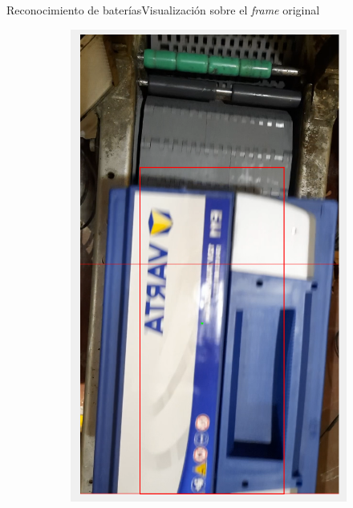 \documentclass{beamer}
\begin{document}
\begin{frame}{Reconocimiento de baterías}{Visualización sobre el \textit{frame} original}
\begin{figure}
    \begin{subfigure}[b]{0.4\textwidth}
        \includegraphics[width=\textwidth]{img/P2.png}
    \end{subfigure}
\end{figure}
\end{frame}
\end{document}
